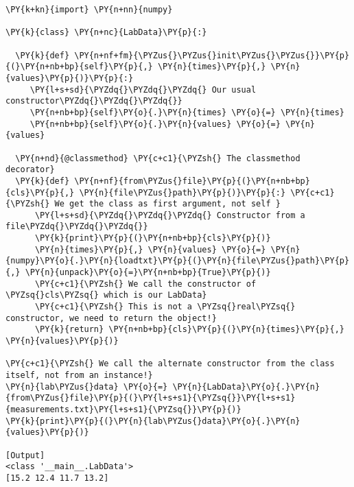 \begin{Verbatim}[label=\makebox{\url{https://github.com/lucabaldini/cmepda/tree/master/slides/latex/snippets/classmethod.py}},commandchars=\\\{\}]
\PY{k+kn}{import} \PY{n+nn}{numpy}

\PY{k}{class} \PY{n+nc}{LabData}\PY{p}{:}
  
  \PY{k}{def} \PY{n+nf+fm}{\PYZus{}\PYZus{}init\PYZus{}\PYZus{}}\PY{p}{(}\PY{n+nb+bp}{self}\PY{p}{,} \PY{n}{times}\PY{p}{,} \PY{n}{values}\PY{p}{)}\PY{p}{:}
     \PY{l+s+sd}{\PYZdq{}\PYZdq{}\PYZdq{} Our usual constructor\PYZdq{}\PYZdq{}\PYZdq{}}
     \PY{n+nb+bp}{self}\PY{o}{.}\PY{n}{times} \PY{o}{=} \PY{n}{times}
     \PY{n+nb+bp}{self}\PY{o}{.}\PY{n}{values} \PY{o}{=} \PY{n}{values}

  \PY{n+nd}{@classmethod} \PY{c+c1}{\PYZsh{} The classmethod decorator}
  \PY{k}{def} \PY{n+nf}{from\PYZus{}file}\PY{p}{(}\PY{n+nb+bp}{cls}\PY{p}{,} \PY{n}{file\PYZus{}path}\PY{p}{)}\PY{p}{:} \PY{c+c1}{\PYZsh{} We get the class as first argument, not self }
      \PY{l+s+sd}{\PYZdq{}\PYZdq{}\PYZdq{} Constructor from a file\PYZdq{}\PYZdq{}\PYZdq{}}
      \PY{k}{print}\PY{p}{(}\PY{n+nb+bp}{cls}\PY{p}{)}
      \PY{n}{times}\PY{p}{,} \PY{n}{values} \PY{o}{=} \PY{n}{numpy}\PY{o}{.}\PY{n}{loadtxt}\PY{p}{(}\PY{n}{file\PYZus{}path}\PY{p}{,} \PY{n}{unpack}\PY{o}{=}\PY{n+nb+bp}{True}\PY{p}{)}
      \PY{c+c1}{\PYZsh{} We call the constructor of \PYZsq{}cls\PYZsq{} which is our LabData}
      \PY{c+c1}{\PYZsh{} This is not a \PYZsq{}real\PYZsq{} constructor, we need to return the object!}
      \PY{k}{return} \PY{n+nb+bp}{cls}\PY{p}{(}\PY{n}{times}\PY{p}{,} \PY{n}{values}\PY{p}{)}

\PY{c+c1}{\PYZsh{} We call the alternate constructor from the class itself, not from an instance!}
\PY{n}{lab\PYZus{}data} \PY{o}{=} \PY{n}{LabData}\PY{o}{.}\PY{n}{from\PYZus{}file}\PY{p}{(}\PY{l+s+s1}{\PYZsq{}}\PY{l+s+s1}{measurements.txt}\PY{l+s+s1}{\PYZsq{}}\PY{p}{)}
\PY{k}{print}\PY{p}{(}\PY{n}{lab\PYZus{}data}\PY{o}{.}\PY{n}{values}\PY{p}{)}

[Output]
<class '__main__.LabData'>
[15.2 12.4 11.7 13.2]
\end{Verbatim}